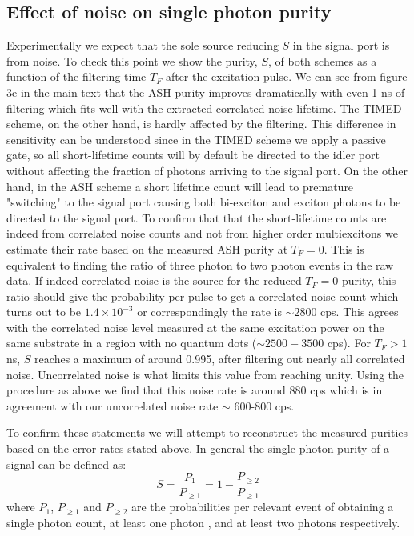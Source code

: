 \documentclass[reprint,onecolumn]{revtex4-1}
\begin{document}
\subsection{Effect of noise on single photon purity }
Experimentally we expect that the sole source reducing $S$ in the signal port is from noise. 
To check this point we show the purity, $S$, of both schemes as a function of the filtering time $T_F$ after the excitation pulse. 
We can see from figure 3e in the main text that the ASH purity improves dramatically with even 1 ns of filtering which fits well with the extracted correlated noise lifetime. 
The TIMED scheme, on the other hand, is hardly affected by the filtering. 
This difference in sensitivity can be understood since in the TIMED scheme we apply a passive gate, so all short-lifetime counts will by default be directed to the idler port without affecting the fraction of photons arriving to the signal port. 
On the other hand, in the ASH scheme a short lifetime count will lead to premature "switching" to the signal port causing both bi-exciton and exciton photons to be directed to the signal port. 
To confirm that that the short-lifetime counts are indeed from correlated noise counts and not from higher order multiexcitons we estimate their rate based on the measured ASH purity at $T_F=0$.
This is equivalent to finding the ratio of three photon to two photon events in the raw data. 
If indeed correlated noise is the source for the reduced $T_F=0$ purity, this ratio  should give the probability per pulse to get a correlated noise count which turns out to be $1.4 \times 10^{-3}$ or correspondingly the rate is $\sim 2800$ cps. 
This agrees with the correlated noise level measured at the same excitation power on the same substrate in a region with no quantum dots ($\sim 2500-3500$ cps). 
For $T_F>1$ ns, $S$ reaches a maximum of around 0.995, after filtering out nearly all correlated noise.
Uncorrelated noise is what limits this value from reaching unity. 
Using the procedure as above we find that this noise rate is around 880 cps which is in agreement with our uncorrelated noise rate $\sim$ 600-800 cps.

To confirm these statements we will attempt to reconstruct the measured purities based on the error rates stated above.
In general the single photon purity of a signal can be defined as:
\[
S=\frac{P_{1}}{P_{\ge1}}=1-\frac{P_{\ge2}}{P_{\ge1}}
\]
where $P_{1}$, $P_{\ge1}$ and $P_{\ge2}$ are the probabilities
per relevant event of obtaining a single photon count, at least one
photon , and at least two photons respectively.
\end{document}
